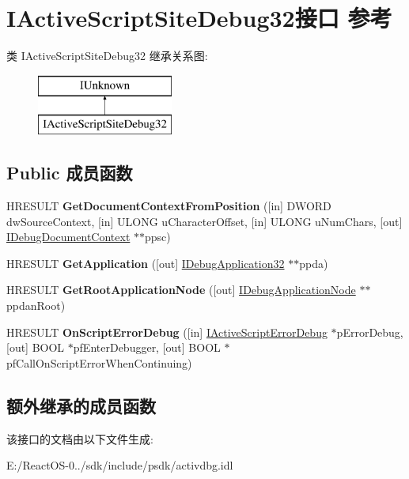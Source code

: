 \hypertarget{interface_i_active_script_site_debug32}{}\section{I\+Active\+Script\+Site\+Debug32接口 参考}
\label{interface_i_active_script_site_debug32}
类 I\+Active\+Script\+Site\+Debug32 继承关系图\+:\begin{figure}[H]
\begin{center}
\leavevmode
\includegraphics[height=2.000000cm]{interface_i_active_script_site_debug32}
\end{center}
\end{figure}
\subsection*{Public 成员函数}
\begin{DoxyCompactItemize}
\item 
\mbox{\label{interface_i_active_script_site_debug32_ab9ea0577bb1fa61e585499037f5a7f33}} 
H\+R\+E\+S\+U\+LT {\bfseries Get\+Document\+Context\+From\+Position} (\mbox{[}in\mbox{]} D\+W\+O\+RD dw\+Source\+Context, \mbox{[}in\mbox{]} U\+L\+O\+NG u\+Character\+Offset, \mbox{[}in\mbox{]} U\+L\+O\+NG u\+Num\+Chars, \mbox{[}out\mbox{]} \hyperlink{interface_i_debug_document_context}{I\+Debug\+Document\+Context} $\ast$$\ast$ppsc)
\item 
\mbox{\label{interface_i_active_script_site_debug32_aebfcd7ff54a6d508ac54541c1237d695}} 
H\+R\+E\+S\+U\+LT {\bfseries Get\+Application} (\mbox{[}out\mbox{]} \hyperlink{interface_i_debug_application32}{I\+Debug\+Application32} $\ast$$\ast$ppda)
\item 
\mbox{\label{interface_i_active_script_site_debug32_a2dd5e08d3f473a752fd51ecd1c23e41e}} 
H\+R\+E\+S\+U\+LT {\bfseries Get\+Root\+Application\+Node} (\mbox{[}out\mbox{]} \hyperlink{interface_i_debug_application_node}{I\+Debug\+Application\+Node} $\ast$$\ast$ppdan\+Root)
\item 
\mbox{\label{interface_i_active_script_site_debug32_a296df77cc656ed39429628ab946dbdd7}} 
H\+R\+E\+S\+U\+LT {\bfseries On\+Script\+Error\+Debug} (\mbox{[}in\mbox{]} \hyperlink{interface_i_active_script_error_debug}{I\+Active\+Script\+Error\+Debug} $\ast$p\+Error\+Debug, \mbox{[}out\mbox{]} B\+O\+OL $\ast$pf\+Enter\+Debugger, \mbox{[}out\mbox{]} B\+O\+OL $\ast$pf\+Call\+On\+Script\+Error\+When\+Continuing)
\end{DoxyCompactItemize}
\subsection*{额外继承的成员函数}


该接口的文档由以下文件生成\+:\begin{DoxyCompactItemize}
\item 
E\+:/\+React\+O\+S-\/0../sdk/include/psdk/activdbg.\+idl\end{DoxyCompactItemize}
